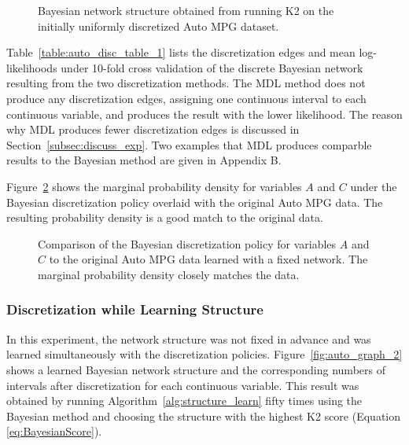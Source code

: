 \documentclass[twoside,11pt]{article}
\begin{document}
\begin{figure}[ht]
  \centering
   
   \caption{Bayesian network structure obtained from running K2 on the initially uniformly discretized Auto MPG dataset.}
  \label{fig:auto_graph_1}
\end{figure}

Table~\ref{table:auto_disc_table_1} lists the discretization edges and mean log-likelihoods under \num{10}-fold cross validation of the discrete Bayesian network resulting from the two discretization methods.
The MDL method does not produce any discretization edges, assigning one continuous interval to each continuous variable, and produces the result with the lower likelihood.
The reason why MDL produces fewer discretization edges is discussed in Section~\ref{subsec:discuss_exp}.
Two examples that MDL produces comparble results to the Bayesian method are given in Appendix B.

\begin{table}[ht]
  \centering
  \caption{
    Discretization result of the Auto MPG dataset with fixed structure from Figure~\ref{fig:auto_graph_1}.
    The first five rows list the discretization edges and the last row lists the mean cross-validated log-likelihood; positive values are better.
  }
  
  \label{table:auto_disc_table_1}
\end{table}

Figure~\ref{fig:auto_exp1_distr_1_3} shows the marginal probability density for variables $A$ and $C$ under the Bayesian discretization policy overlaid with the original Auto MPG data.
The resulting probability density is a good match to the original data.

\begin{figure}[ht]
  \centering
  
  \caption{
    Comparison of the Bayesian discretization policy for variables $A$ and $C$ to the original Auto MPG data learned with a fixed network.
    The marginal probability density closely matches the data.
  }
  \label{fig:auto_exp1_distr_1_3}
\end{figure}

\subsubsection{Discretization while Learning Structure}
\label{subsubsec:auto_exp2}

In this experiment, the network structure was not fixed in advance and was learned simultaneously with the discretization policies.
Figure~\ref{fig:auto_graph_2} shows a learned Bayesian network structure and the corresponding numbers of intervals after discretization for each continuous variable.
This result was obtained by running Algorithm~\ref{alg:structure_learn} fifty times using the Bayesian method and choosing the structure with the highest K2 score (Equation \ref{eq:BayesianScore}).
\end{document}

